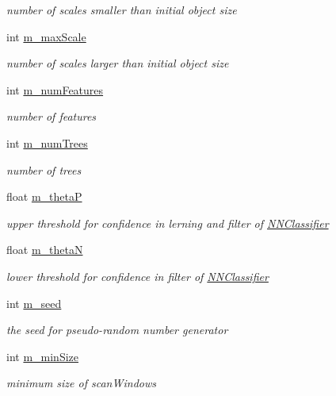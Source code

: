 \begin{DoxyCompactItemize}
\begin{DoxyCompactList}\small\item\em number of scales smaller than initial object size \end{DoxyCompactList}\item 
int \hyperlink{classtld_1_1Settings_a548c317f8242ea8513d13573acdaaa4c}{m\-\_\-max\-Scale}
\begin{DoxyCompactList}\small\item\em number of scales larger than initial object size \end{DoxyCompactList}\item 
int \hyperlink{classtld_1_1Settings_af15afe9f4ffb32e89686c8e90026e2bc}{m\-\_\-num\-Features}
\begin{DoxyCompactList}\small\item\em number of features \end{DoxyCompactList}\item 
int \hyperlink{classtld_1_1Settings_a959d793b002e13f6758fc84765b7d33d}{m\-\_\-num\-Trees}
\begin{DoxyCompactList}\small\item\em number of trees \end{DoxyCompactList}\item 
float \hyperlink{classtld_1_1Settings_adade7d3269f34113e92abdb3816058f7}{m\-\_\-theta\-P}
\begin{DoxyCompactList}\small\item\em upper threshold for confidence in lerning and filter of \hyperlink{classtld_1_1NNClassifier}{N\-N\-Classifier} \end{DoxyCompactList}\item 
float \hyperlink{classtld_1_1Settings_aef49627d1ffac7dda7cc83c7ba6a25bd}{m\-\_\-theta\-N}
\begin{DoxyCompactList}\small\item\em lower threshold for confidence in filter of \hyperlink{classtld_1_1NNClassifier}{N\-N\-Classifier} \end{DoxyCompactList}\item 
int \hyperlink{classtld_1_1Settings_a07dc62407c3373e7fa3906c145593b69}{m\-\_\-seed}
\begin{DoxyCompactList}\small\item\em the seed for pseudo-\/random number generator \end{DoxyCompactList}\item 
int \hyperlink{classtld_1_1Settings_aa08ffe8f36cb983224fadfd3d3b28391}{m\-\_\-min\-Size}
\begin{DoxyCompactList}\small\item\em minimum size of scan\-Windows \end{DoxyCompactList}\item 

\end{DoxyCompactItemize}
